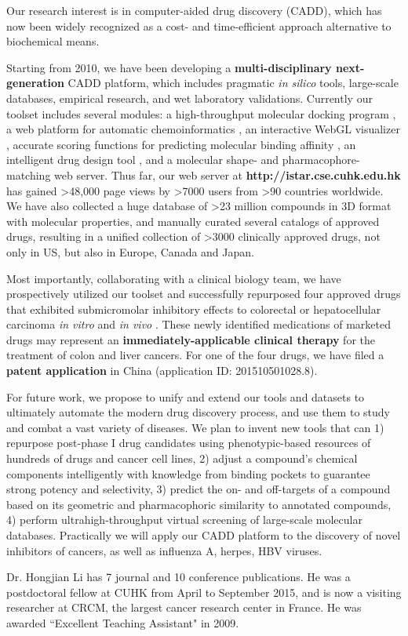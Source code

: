 \documentclass[a4paper,12pt]{article}
\begin{document}
Our research interest is in computer-aided drug discovery (CADD), which has now been widely recognized as a cost- and time-efficient approach alternative to biochemical means.

Starting from 2010, we have been developing a \textbf{multi-disciplinary next-generation} CADD platform, which includes pragmatic \textit{in silico} tools, large-scale databases, empirical research, and wet laboratory validations. Currently our toolset includes several modules: a high-throughput molecular docking program \cite{1153}, a web platform for automatic chemoinformatics \cite{1362}, an interactive WebGL visualizer \cite{1366}, accurate scoring functions for predicting molecular binding affinity \cite{1432,1647,1434,1663}, an intelligent drug design tool \cite{1409,1387}, and a molecular shape- and pharmacophore-matching web server. Thus far, our web server at \textbf{http://istar.cse.cuhk.edu.hk} has gained \textgreater48,000 page views by \textgreater7000 users from \textgreater90 countries worldwide. We have also collected a huge database of \textgreater23 million compounds in 3D format with molecular properties, and manually curated several catalogs of approved drugs, resulting in a unified collection of \textgreater3000 clinically approved drugs, not only in US, but also in Europe, Canada and Japan.

Most importantly, collaborating with a clinical biology team, we have prospectively utilized our toolset and successfully repurposed four approved drugs that exhibited submicromolar inhibitory effects to colorectal or hepatocellular carcinoma \textit{in vitro} and \textit{in vivo} \cite{1667,1681}. These newly identified medications of marketed drugs may represent an \textbf{immediately-applicable clinical therapy} for the treatment of colon and liver cancers. For one of the four drugs, we have filed a \textbf{patent application} in China (application ID: 201510501028.8).

For future work, we propose to unify and extend our tools and datasets to ultimately automate the modern drug discovery process, and use them to study and combat a vast variety of diseases. We plan to invent new tools that can 1) repurpose post-phase I drug candidates using phenotypic-based resources of hundreds of drugs and cancer cell lines, 2) adjust a compound's chemical components intelligently with knowledge from binding pockets to guarantee strong potency and selectivity, 3) predict the on- and off-targets of a compound based on its geometric and pharmacophoric similarity to annotated compounds, 4) perform ultrahigh-throughput virtual screening of large-scale molecular databases. Practically we will apply our CADD platform to the discovery of novel inhibitors of cancers, as well as influenza A, herpes, HBV viruses.

Dr. Hongjian Li has 7 journal and 10 conference publications. He was a postdoctoral fellow at CUHK from April to September 2015, and is now a visiting researcher at CRCM, the largest cancer research center in France. He was awarded ``Excellent Teaching Assistant" in 2009.

\linespread{0.5}
\tiny


\end{document}

